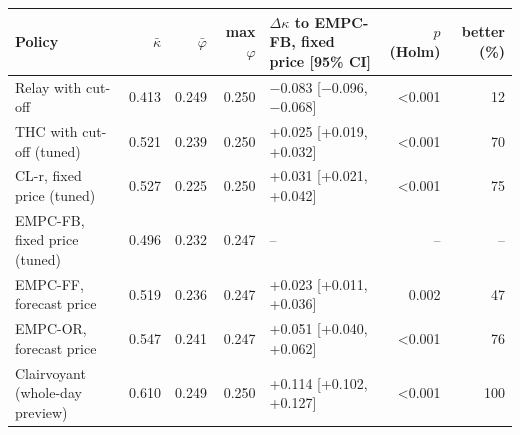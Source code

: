 \begin{tabular}{lrrrlrr}
\toprule
Policy & $\bar\kappa$ & $\bar\varphi$ & max $\varphi$ & $\Delta\kappa$ to EMPC-FB, fixed price [95\% CI] & $p$ (Holm) & better (\%)\\
\midrule
Relay with cut-off & 0.413 & 0.249 & 0.250 & \ensuremath{-}0.083 [\ensuremath{-}0.096, \ensuremath{-}0.068] & <0.001 & 12\\
THC with cut-off (tuned) & 0.521 & 0.239 & 0.250 & +0.025 [+0.019, +0.032] & <0.001 & 70\\
\midrule
CL-r, fixed price (tuned) & 0.527 & 0.225 & 0.250 & +0.031 [+0.021, +0.042] & <0.001 & 75\\
EMPC-FB, fixed price (tuned) & 0.496 & 0.232 & 0.247 & -- & -- & --\\
\midrule
EMPC-FF, forecast price & 0.519 & 0.236 & 0.247 & +0.023 [+0.011, +0.036] & 0.002 & 47\\
\midrule
EMPC-OR, forecast price & 0.547 & 0.241 & 0.247 & +0.051 [+0.040, +0.062] & <0.001 & 76\\
Clairvoyant (whole-day preview) & 0.610 & 0.249 & 0.250 & +0.114 [+0.102, +0.127] & <0.001 & 100\\
\bottomrule
\end{tabular}
